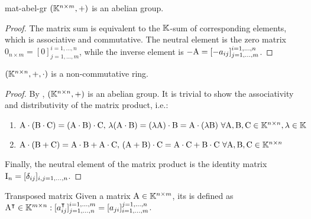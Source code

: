 \begin{proposition}{}{mat-abel-gr}
  $ (\mathbb{K}^{n \times m} , +) $ is an abelian group.
\end{proposition}

\begin{proofbox}
  \begin{proof}
    The matrix sum is equivalent to the $ \mathbb{K} $-sum of corresponding elements, which is associative and commutative. The neutral element is the zero matrix $ 0_{n \times m} = [0]^{i = 1, \dots, n}_{j = 1, \dots, m} $, while the inverse element is $ -\mathrm{A} = [-a_{ij}]^{i = 1, \dots, n}_{j = 1, \dots, m} $.
  \end{proof}
\end{proofbox}

\begin{theorem}{}{}
  $ (\mathbb{K}^{n \times n} , + , \cdot) $ is a non-commutative ring.
\end{theorem}

\begin{proofbox}
  \begin{proof}
    By , $ (\mathbb{K}^{n \times n} , +) $ is an abelian group. It is trivial to show the associativity and distributivity of the matrix product, i.e.:
    \begin{enumerate}
      \item $ \mathrm{A} \cdot (\mathrm{B} \cdot \mathrm{C}) = (\mathrm{A} \cdot \mathrm{B}) \cdot \mathrm{C} ,\, \lambda (\mathrm{A} \cdot \mathrm{B}) = (\lambda \mathrm{A}) \cdot \mathrm{B} = \mathrm{A} \cdot (\lambda \mathrm{B}) \,\,\forall \mathrm{A} , \mathrm{B} , \mathrm{C} \in \mathbb{K}^{n \times n} , \lambda \in \mathbb{K} $
      \item $ \mathrm{A} \cdot (\mathrm{B} + \mathrm{C}) = \mathrm{A} \cdot \mathrm{B} + \mathrm{A} \cdot \mathrm{C} ,\, (\mathrm{A} + \mathrm{B}) \cdot \mathrm{C} = \mathrm{A} \cdot \mathrm{C} + \mathrm{B} \cdot \mathrm{C} \,\,\forall \mathrm{A} , \mathrm{B} , \mathrm{C} \in \mathbb{K}^{n \times n} $
    \end{enumerate}
    Finally, the neutral element of the matrix product is the identity matrix $ \mathrm{I}_n = [\delta_{ij}]_{i,j = 1, \dots, n} $.
  \end{proof}
\end{proofbox}

\begin{definition}{Transposed matrix}{}
  Given a matrix $ \mathrm{A} \in \mathbb{K}^{n \times m} $, its  is defined as $ \mathrm{A}^\intercal \in \mathbb{K}^{m \times n} : [a^\intercal_{ij}]^{i = 1, \dots, m}_{j = 1, \dots, n} = [a_{ji}]^{j = 1, \dots, n}_{i = 1, \dots, m} $.
\end{definition}

